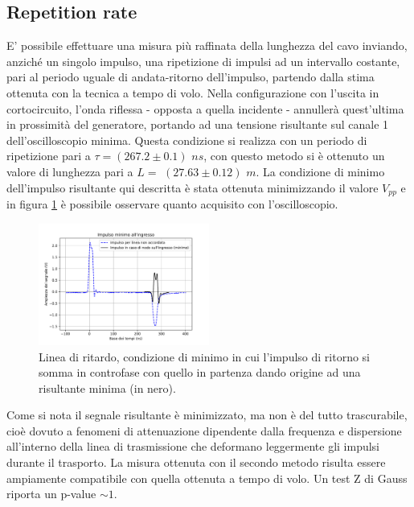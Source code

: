 \documentclass[journal]{IEEEtran}
\begin{document}
\subsection{Repetition rate}
E' possibile effettuare una misura più raffinata della lunghezza del cavo inviando, anziché un singolo impulso, una ripetizione di impulsi ad un intervallo costante, pari al periodo uguale di andata-ritorno dell'impulso, partendo dalla stima ottenuta con la tecnica a tempo di volo. Nella configurazione con l'uscita in cortocircuito, l'onda riflessa - opposta a quella incidente - annullerà quest'ultima in prossimità del generatore, portando ad una tensione risultante sul canale 1 dell'oscilloscopio minima. Questa condizione si realizza con un periodo di ripetizione pari a $\tau = (267.2 \pm 0.1)$ $ns$, con questo metodo si è ottenuto un valore di lunghezza pari a $ L = $ $(27.63 \pm 0.12)$ $m $. La condizione di minimo dell'impulso risultante qui descritta è stata ottenuta minimizzando il valore $V_{pp}$ e in figura \ref{fig: ripetizione di impulsi} è possibile osservare quanto acquisito con l'oscilloscopio.

\begin{figure}[H]%
\begin{center}
\includegraphics[width=0.5\textwidth]{analysis/output/Delay_line_repetition.pdf}
\caption{Linea di ritardo, condizione di minimo in cui l'impulso di ritorno si somma in controfase con quello in partenza dando origine ad una risultante minima (in nero).}
\label{fig: ripetizione di impulsi}
\end{center}
\end{figure}

Come si nota il segnale risultante è minimizzato, ma non è del tutto trascurabile, cioè dovuto a fenomeni di attenuazione dipendente dalla frequenza e dispersione all'interno della linea di trasmissione che deformano leggermente gli impulsi durante il trasporto.
La misura ottenuta con il secondo metodo risulta essere ampiamente compatibile con quella ottenuta a tempo di volo. Un test Z di Gauss riporta un p-value $\sim 1$.
\end{document}
